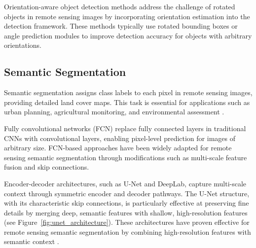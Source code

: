 \documentclass[12pt,a4paper]{article}
\begin{document}
Orientation-aware object detection methods address the challenge of rotated objects in remote sensing images by incorporating orientation estimation into the detection framework. These methods typically use rotated bounding boxes or angle prediction modules to improve detection accuracy for objects with arbitrary orientations.

\subsection{Semantic Segmentation}
Semantic segmentation assigns class labels to each pixel in remote sensing images, providing detailed land cover maps. This task is essential for applications such as urban planning, agricultural monitoring, and environmental assessment \cite{maggiori2017end}.

Fully convolutional networks (FCN) replace fully connected layers in traditional CNNs with convolutional layers, enabling pixel-level prediction for images of arbitrary size. FCN-based approaches have been widely adapted for remote sensing semantic segmentation through modifications such as multi-scale feature fusion and skip connections.

Encoder-decoder architectures, such as U-Net and DeepLab, capture multi-scale context through symmetric encoder and decoder pathways. The U-Net structure, with its characteristic skip connections, is particularly effective at preserving fine details by merging deep, semantic features with shallow, high-resolution features (see Figure~\ref{fig:unet_architecture}). These architectures have proven effective for remote sensing semantic segmentation by combining high-resolution features with semantic context \cite{liu2019learning}.
\end{document}
